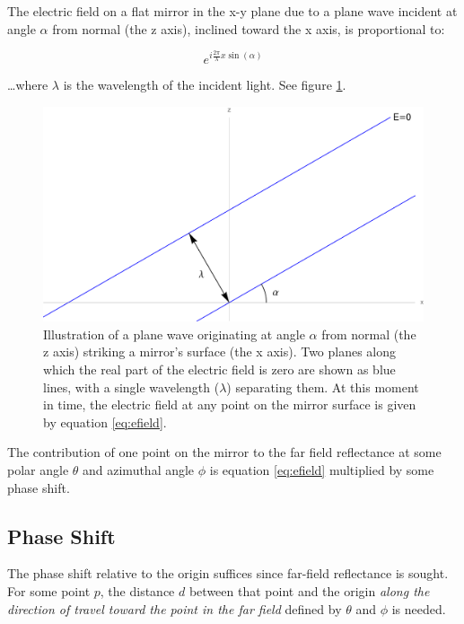 \documentclass[etd,senior,noacknowledgments]{BYUPhys}
\begin{document}
The electric field on a flat mirror in the x-y plane due to a plane wave incident at angle $\alpha$ from normal (the z axis), inclined toward the x axis, is proportional to:

\begin{equation} \label{eq:efield}
  e^{i\frac{2\pi}{\lambda}x\sin\left({\alpha}\right)}
\end{equation}

\ldots where $\lambda$ is the wavelength of the incident light. See figure \ref{fig:efield_at_angle}.

\begin{figure}
  \centerline{\includegraphics[width=\textwidth]{efield-at-angle}}
  \caption[Plane wave incident on mirror surface at angle $\alpha$]{\label{fig:efield_at_angle}
    Illustration of a plane wave originating at angle $\alpha$ from normal (the z axis) striking a mirror's surface (the x axis). Two planes along which the real part of the electric field is zero are shown as blue lines, with a single wavelength ($\lambda$) separating them. At this moment in time, the electric field at any point on the mirror surface is given by equation \ref{eq:efield}.}
\end{figure}

The contribution of one point on the mirror to the far field reflectance at some polar angle $\theta$ and azimuthal angle $\phi$ is equation \ref{eq:efield} multiplied by some phase shift.

\subsection{Phase Shift} \label{sec:phase_shift}

The phase shift relative to the origin suffices since far-field reflectance is sought. For some point $p$, the distance $d$ between that point and the origin \textit{along the direction of travel toward the point in the far field} defined by $\theta$ and $\phi$ is needed.
\end{document}
